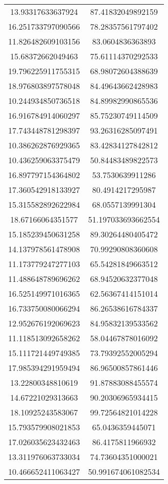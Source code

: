 \begin{table}
\begin{tabular}{cc}
13.93317633637924 & 87.41832049892159 \\
16.251733797090566 & 78.28357561797402 \\
11.826482609103156 & 83.0604836363893 \\
15.68372662049463 & 75.61114370292533 \\
19.796225911755315 & 68.98072604388639 \\
18.976803897578048 & 84.49643662428983 \\
10.244934850736518 & 84.89982990865536 \\
16.916784914060297 & 85.75230749114509 \\
17.743448781298397 & 93.26316285097491 \\
10.386262876929365 & 83.42834127842812 \\
10.436259063375479 & 50.84483489822573 \\
16.897797154364802 & 53.7530639911286 \\
17.360542918133927 & 80.4914217295987 \\
15.315582892622984 & 68.0557139991304 \\
18.67166064351577 & 51.197033693662554 \\
15.185239450631258 & 89.30264480405472 \\
14.137978561478908 & 70.99290808360608 \\
11.173779247277103 & 65.54281849663512 \\
11.488648789696262 & 68.94520632377048 \\
16.525149971016365 & 62.56367414151014 \\
16.733750080066294 & 86.26538616784337 \\
12.952676192069623 & 84.95832139533562 \\
11.118513092658262 & 58.04467878016092 \\
15.111721449749385 & 73.79392552005294 \\
17.985394291959494 & 86.96500857861446 \\
13.22800348810619 & 91.87883088455574 \\
14.67221029313663 & 90.20306965934415 \\
18.10925243583067 & 99.72564821014228 \\
15.793579908021853 & 65.0436359445071 \\
17.026035623432463 & 86.4175811966932 \\
13.311976063733034 & 74.73604351000021 \\
10.466652411063427 & 50.991674061082534 \\

\end{tabular}
\end{table}
